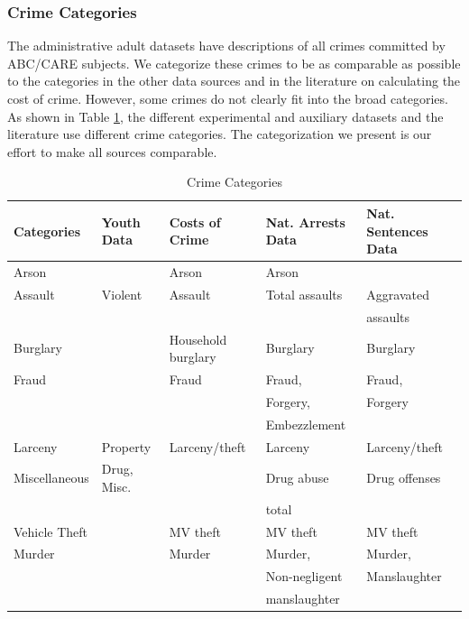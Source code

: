 \subsubsection{Crime Categories}
\noindent The administrative adult datasets have descriptions of all crimes committed by ABC/CARE subjects. We categorize these crimes to be as comparable as possible to the categories in the other data sources and in the literature on calculating the cost of crime. However, some crimes do not clearly fit into the broad categories. As shown in Table \ref{tab:crime_cat}, the different experimental and auxiliary datasets and the literature use different crime categories. The categorization we present is our effort to make all sources comparable.

\begin{table}[H]
\begin{threeparttable}
\scriptsize \caption{Crime Categories} \label{tab:crime_cat}
\begin{tabular}{lllll}
\toprule
{Categories}	&	{Youth Data} & {Costs of Crime} & {Nat. Arrests Data} & {Nat. Sentences Data}	\\
\midrule
{Arson}			&			& Arson					&	Arson			&					\\	
{Assault}			&	Violent			& Assault				&	Total assaults	& Aggravated 		\\		
				&				&						&					& assaults 			\\ 		
{Burglary}		&				& Household burglary	&	Burglary		& Burglary			\\		
{Fraud}			&				& Fraud					&	Fraud,			& Fraud,			\\		
				&				&						&	Forgery,		& Forgery			\\
				&				&						&	Embezzlement	&					\\		
{Larceny}			&	Property	& Larceny/theft			&	Larceny			& Larceny/theft		\\		
{Miscellaneous}	& 	Drug, Misc.	& 					&	Drug abuse		& Drug offenses		\\		
				&				&						&	total			&					\\ 		
{Vehicle Theft}	&				& MV theft	&	MV theft		& MV theft			\\		
{Murder}			&				& Murder				&	Murder,			& Murder,			\\	
				&				&						& 	Non-negligent 	& Manslaughter		\\
				&				&						& 	manslaughter	&   				\\

\end{tabular}
\end{threeparttable}
\end{table}
